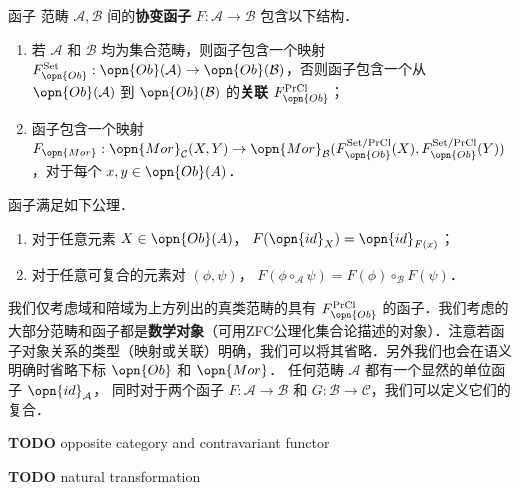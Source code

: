\begin{definition}{函子}
范畴 $\mathcal{A},\mathcal{B}$ 间的\textbf{协变函子} $F:\mathcal{A}\to\mathcal{B}$ 包含以下结构．
\begin{enumerate}
    \item 若 $\mathcal{A}$ 和 $\mathcal{B}$ 均为集合范畴，则函子包含一个映射 $F_{\opn{Ob}}^{\text{Set}}:\opn{Ob}(\mathcal{A})\to\opn{Ob}(\mathcal{B})$，否则函子包含一个从 $\opn{Ob}(\mathcal{A})$ 到 $\opn{Ob}(\mathcal{B})$ 的\textbf{关联} $F_{\opn{Ob}}^{\text{PrCl}}$；
    \item 函子包含一个映射 $F_{\opn{Mor}}:\opn{Mor}_\mathcal{C}(X,Y)\to\opn{Mor}_\mathcal{B}(F_{\opn{Ob}}^{\text{Set/PrCl}}(X),F_{\opn{Ob}}^{\text{Set/PrCl}}(Y))$，对于每个 $x,y\in\opn{Ob}(A)$．
\end{enumerate}
函子满足如下公理．
\begin{enumerate}
    \item 对于任意元素 $X\in\opn{Ob}(A)$， $F(\opn{id}_X)=\opn{id}_{F(x)}$；
    \item 对于任意可复合的元素对 $(\phi,\psi)$， $F(\phi\circ_\mathcal{A}\psi)=F(\phi)\circ_\mathcal{B}F(\psi)$．
\end{enumerate}
\end{definition}
我们仅考虑域和陪域为上方列出的真类范畴的具有 $F_{\opn{Ob}}^{\text{PrCl}}$ 的函子．我们考虑的大部分范畴和函子都是\textbf{数学对象}（可用ZFC公理化集合论描述的对象）．注意若函子对象关系的类型（映射或关联）明确，我们可以将其省略．另外我们也会在语义明确时省略下标 $\opn{Ob}$ 和 $\opn{Mor}$． 任何范畴 $\mathcal{A}$ 都有一个显然的单位函子 $\opn{id}_\mathcal{A}$， 同时对于两个函子 $F:\mathcal{A}\to\mathcal{B}$ 和 $G:\mathcal{B}\to\mathcal{C}$，我们可以定义它们的复合．

\textbf{TODO} opposite category and contravariant functor

\textbf{TODO} natural transformation

